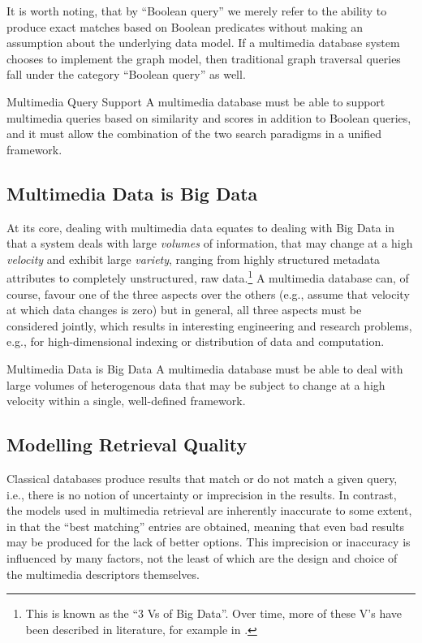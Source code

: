 It is worth noting, that by ``Boolean query'' we merely refer to the ability to produce exact matches based on Boolean predicates without making an assumption about the underlying data model. If a multimedia database system chooses to implement the graph model, then traditional graph traversal queries fall under the category ``Boolean query'' as well.

\begin{requirement}[label=requirement:multimedia_search]{Multimedia Query Support}{}
    A multimedia database must be able to support multimedia queries based on similarity and scores in addition to Boolean queries, and it must allow the combination of the two search paradigms in a unified framework.
\end{requirement}

\subsection{Multimedia Data is Big Data}
At its core, dealing with multimedia data equates to dealing with Big Data in that a system deals with large \emph{volumes} of information, that may change at a high \emph{velocity} and exhibit large \emph{variety}, ranging from highly structured metadata attributes to completely unstructured, raw data.\footnote{This is known as the ``3 Vs of Big Data''. Over time, more of these V's have been described in literature, for example in \cite{Khan:2014Seven}.} A multimedia database can, of course, favour one of the three aspects over the others (e.g., assume that velocity at which data changes is zero) but in general, all three aspects must be considered jointly, which results in interesting engineering and research problems, e.g., for high-dimensional indexing \cite{Hojsgaard:2019Index} or distribution of data and computation.

\begin{requirement}[label=requirement:big_data]{Multimedia Data is Big Data}{}
    A multimedia database must be able to deal with large volumes of heterogenous data that may be subject to change at a high velocity within a single, well-defined framework.
\end{requirement}

\subsection{Modelling Retrieval Quality}

Classical databases produce results that match or do not match a given query, i.e., there is no notion of uncertainty or imprecision in the results. In contrast, the models used in multimedia retrieval are inherently inaccurate to some extent, in that the ``best matching'' entries are obtained, meaning that even bad results may be produced for the lack of better options. This imprecision or inaccuracy is influenced by many factors, not the least of which are the design and choice of the multimedia descriptors themselves.

